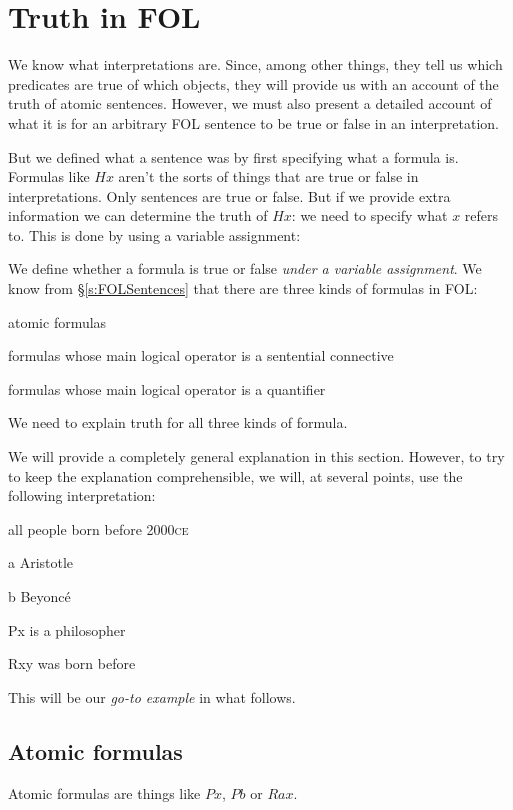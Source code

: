 \chapter{Truth in FOL}\label{s:TruthFOL}
We know what interpretations are. Since, among other things, they tell us which predicates are true of which objects, they will provide us with an account of the truth of atomic sentences. However, we must also present a detailed account of what it is for an arbitrary FOL sentence to be true or false in an interpretation.

But we defined what a sentence was by first specifying what a formula is. Formulas like $Hx$ aren't the sorts of things that are true or false in interpretations. Only sentences are true or false. But if we provide extra information we can determine the truth of $Hx$: we need to specify what $x$ refers to. This is done by using a variable assignment: 

We define whether a formula is true or false \emph{under a variable assignment}.
We know from \S\ref{s:FOLSentences} that there are three kinds of formulas in FOL:
	\begin{ebullet}
		\item atomic formulas
		\item formulas whose main logical operator is a sentential connective
		\item formulas whose main logical operator is a quantifier
	\end{ebullet}
We need to explain truth for all three kinds of formula.

We will provide a completely general explanation in this section. However, to try to keep the explanation comprehensible, we will, at several points, use the following interpretation:
	\begin{ekey}
		\item[\text{domain}] all people born before 2000\textsc{ce}
		\item[a] Aristotle
		\item[b] Beyonc\'e
		\item[Px]  is a philosopher
		\item[Rxy]  was born before 
	\end{ekey}
This will be our \emph{go-to example} in what follows.

\section{Atomic formulas}
Atomic formulas are things like $Px$, $Pb$ or $Rax$.

